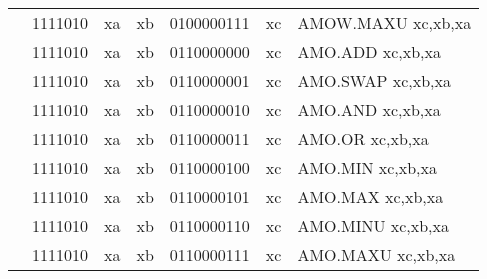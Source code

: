 \begin{table}[p]
\begin{small}
\begin{center}
\begin{tabular}{rcccccccccl}
&
\multicolumn{2}{|c|}{1111010} &
\multicolumn{1}{c|}{xa} &
\multicolumn{1}{c|}{xb} &
\multicolumn{4}{c|}{0100000111} &
\multicolumn{1}{c|}{xc} & AMOW.MAXU xc,xb,xa \\
\cline{2-10}
  

&
\multicolumn{2}{|c|}{1111010} &
\multicolumn{1}{c|}{xa} &
\multicolumn{1}{c|}{xb} &
\multicolumn{4}{c|}{0110000000} &
\multicolumn{1}{c|}{xc} & AMO.ADD xc,xb,xa \\
\cline{2-10}
  

&
\multicolumn{2}{|c|}{1111010} &
\multicolumn{1}{c|}{xa} &
\multicolumn{1}{c|}{xb} &
\multicolumn{4}{c|}{0110000001} &
\multicolumn{1}{c|}{xc} & AMO.SWAP xc,xb,xa \\
\cline{2-10}
  

&
\multicolumn{2}{|c|}{1111010} &
\multicolumn{1}{c|}{xa} &
\multicolumn{1}{c|}{xb} &
\multicolumn{4}{c|}{0110000010} &
\multicolumn{1}{c|}{xc} & AMO.AND xc,xb,xa \\
\cline{2-10}
  

&
\multicolumn{2}{|c|}{1111010} &
\multicolumn{1}{c|}{xa} &
\multicolumn{1}{c|}{xb} &
\multicolumn{4}{c|}{0110000011} &
\multicolumn{1}{c|}{xc} & AMO.OR xc,xb,xa \\
\cline{2-10}
  

&
\multicolumn{2}{|c|}{1111010} &
\multicolumn{1}{c|}{xa} &
\multicolumn{1}{c|}{xb} &
\multicolumn{4}{c|}{0110000100} &
\multicolumn{1}{c|}{xc} & AMO.MIN xc,xb,xa \\
\cline{2-10}
  

&
\multicolumn{2}{|c|}{1111010} &
\multicolumn{1}{c|}{xa} &
\multicolumn{1}{c|}{xb} &
\multicolumn{4}{c|}{0110000101} &
\multicolumn{1}{c|}{xc} & AMO.MAX xc,xb,xa \\
\cline{2-10}
  

&
\multicolumn{2}{|c|}{1111010} &
\multicolumn{1}{c|}{xa} &
\multicolumn{1}{c|}{xb} &
\multicolumn{4}{c|}{0110000110} &
\multicolumn{1}{c|}{xc} & AMO.MINU xc,xb,xa \\
\cline{2-10}
  

&
\multicolumn{2}{|c|}{1111010} &
\multicolumn{1}{c|}{xa} &
\multicolumn{1}{c|}{xb} &
\multicolumn{4}{c|}{0110000111} &
\multicolumn{1}{c|}{xc} & AMO.MAXU xc,xb,xa \\
\cline{2-10}
  

\end{tabular}
\end{center}
\end{small}

\label{instr-table}
\end{table}
  


